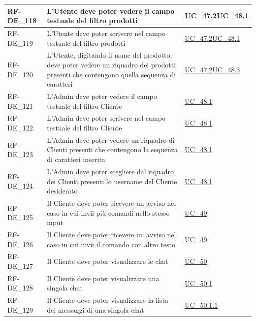 \begin{longtable}{|>{\raggedright}p{}|>{\raggedright\arraybackslash}p{}|>{\raggedright\arraybackslash}p{}|}
	\hline
	RF-DE\_118 \hypertarget{rf-de_118} & L'Utente deve poter vedere il campo testuale del filtro prodotti & \hyperref[uc_47.2]{UC\_47.2}\newline \hyperref[uc_48.1]{UC\_48.1} \\
	\hline
	RF-DE\_119 \hypertarget{rf-de_119} & L'Utente deve poter scrivere nel campo testuale del filtro prodotti & \hyperref[uc_47.2]{UC\_47.2}\newline \hyperref[uc_48.1]{UC\_48.1} \\
	\hline
	RF-DE\_120 \hypertarget{rf-de_120} & L'Utente, digitando il nome del prodotto, deve poter vedere un riquadro dei prodotti presenti che contengono quella sequenza di caratteri & \hyperref[uc_47.2]{UC\_47.2}\newline \hyperref[uc_48.3]{UC\_48.3} \\
	\hline
	RF-DE\_121 \hypertarget{rf-de_121} & L'Admin deve poter vedere il campo testuale del filtro Cliente & \hyperref[uc_48.1]{UC\_48.1} \\
	\hline
	RF-DE\_122 \hypertarget{rf-de_122} & L'Admin deve poter scrivere nel campo testuale del filtro Cliente & \hyperref[uc_48.1]{UC\_48.1} \\
	\hline
	RF-DE\_123 \hypertarget{rf-de_123} & L'Admin deve poter vedere un riquadro di Clienti presenti che contengono la sequenza di caratteri inserita & \hyperref[uc_48.1]{UC\_48.1} \\
	\hline
	RF-DE\_124 \hypertarget{rf-de_124} & L'Admin deve poter scegliere dal riquadro dei Clienti presenti lo username del Cliente desiderato & \hyperref[uc_48.1]{UC\_48.1} \\
	\hline
	RF-DE\_125 \hypertarget{rf-de_125} & Il Cliente deve poter ricevere un avviso nel caso in cui invii più comandi nello stesso input & \hyperref[uc_49]{UC\_49} \\
	\hline
	RF-DE\_126 \hypertarget{rf-de_126} & Il Cliente deve poter ricevere un avviso nel caso in cui invii il comando con altro testo & \hyperref[uc_49]{UC\_49} \\
	\hline
	RF-DE\_127 \hypertarget{rf-de_127} & Il Cliente deve poter visualizzare le chat & \hyperref[uc_50]{UC\_50} \\
	\hline
	RF-DE\_128 \hypertarget{rf-de_128} & Il Cliente deve poter visualizzare una singola chat & \hyperref[uc_50.1]{UC\_50.1} \\
	\hline
	RF-DE\_129 \hypertarget{rf-de_129} & Il Cliente deve poter visualizzare la lista dei messaggi di una singola chat & \hyperref[uc_50.1.1]{UC\_50.1.1} \\

\end{longtable}

